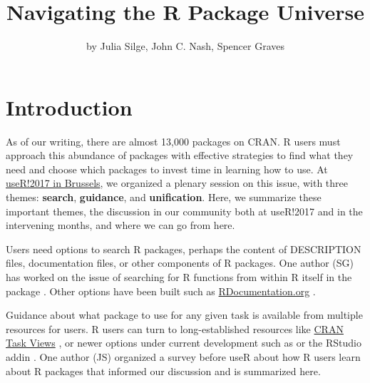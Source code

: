 \title{Navigating the R Package Universe}
\author{by Julia Silge, John C. Nash, Spencer Graves}

\maketitle



\hypertarget{introduction}{%
\section{Introduction}\label{introduction}}

As of our writing, there are almost 13,000 packages on CRAN. R users
must approach this abundance of packages with effective strategies to
find what they need and choose which packages to invest time in learning
how to use. At \href{https://user2017.brussels/}{useR!2017 in Brussels},
we organized a plenary session on this issue, with three themes:
\textbf{search}, \textbf{guidance}, and \textbf{unification}. Here, we
summarize these important themes, the discussion in our community both
at useR!2017 and in the intervening months, and where we can go from
here.

Users need options to search R packages, perhaps the content of
DESCRIPTION files, documentation files, or other components of R
packages. One author (SG) has worked on the issue of searching for R
functions from within R itself in the  package \citep{sos}.
Other options have been built such as
\href{https://www.rdocumentation.org/}{RDocumentation.org}
\citep{rdocumentation}.

Guidance about what package to use for any given task is available from
multiple resources for users. R users can turn to long-established
resources like \href{https://cloud.r-project.org/web/views/}{CRAN Task
Views} \citep{ctvs}, or newer options under current development such as
 \citep{packagemetrics} or the
 RStudio addin \citep{cransearcher}. One author
(JS) organized a survey before useR about how R users learn about R
packages that informed our discussion and is summarized here.

